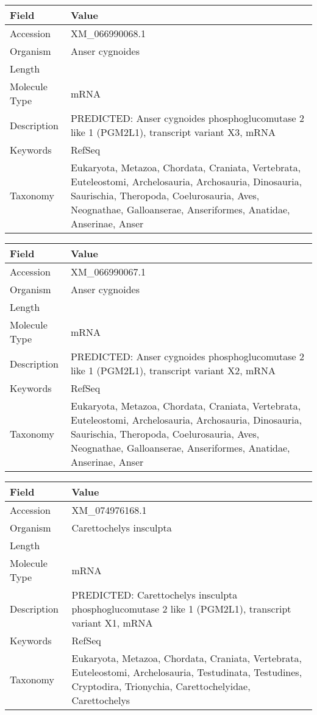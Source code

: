\documentclass[10pt]{article}
\begin{document}
{\footnotesize
\begin{longtable}{>{\raggedright\arraybackslash}p{4.5cm} >{\raggedright\arraybackslash}p{11.5cm}}
\textbf{Field} & \textbf{Value} \\
\hline
Accession & XM\_066990068.1 \\
Organism & Anser cygnoides \\
Length & 6268 \\
Molecule Type & mRNA \\
Description & PREDICTED: Anser cygnoides phosphoglucomutase 2 like 1 (PGM2L1), transcript variant X3, mRNA \\
Keywords & RefSeq \\
Taxonomy & Eukaryota, Metazoa, Chordata, Craniata, Vertebrata, Euteleostomi, Archelosauria, Archosauria, Dinosauria, Saurischia, Theropoda, Coelurosauria, Aves, Neognathae, Galloanserae, Anseriformes, Anatidae, Anserinae, Anser \\
\end{longtable}
}

{\footnotesize
\begin{longtable}{>{\raggedright\arraybackslash}p{4.5cm} >{\raggedright\arraybackslash}p{11.5cm}}
\textbf{Field} & \textbf{Value} \\
\hline
Accession & XM\_066990067.1 \\
Organism & Anser cygnoides \\
Length & 6342 \\
Molecule Type & mRNA \\
Description & PREDICTED: Anser cygnoides phosphoglucomutase 2 like 1 (PGM2L1), transcript variant X2, mRNA \\
Keywords & RefSeq \\
Taxonomy & Eukaryota, Metazoa, Chordata, Craniata, Vertebrata, Euteleostomi, Archelosauria, Archosauria, Dinosauria, Saurischia, Theropoda, Coelurosauria, Aves, Neognathae, Galloanserae, Anseriformes, Anatidae, Anserinae, Anser \\
\end{longtable}
}

{\footnotesize
\begin{longtable}{>{\raggedright\arraybackslash}p{4.5cm} >{\raggedright\arraybackslash}p{11.5cm}}
\textbf{Field} & \textbf{Value} \\
\hline
Accession & XM\_074976168.1 \\
Organism & Carettochelys insculpta \\
Length & 7568 \\
Molecule Type & mRNA \\
Description & PREDICTED: Carettochelys insculpta phosphoglucomutase 2 like 1 (PGM2L1), transcript variant X1, mRNA \\
Keywords & RefSeq \\
Taxonomy & Eukaryota, Metazoa, Chordata, Craniata, Vertebrata, Euteleostomi, Archelosauria, Testudinata, Testudines, Cryptodira, Trionychia, Carettochelyidae, Carettochelys \\
\end{longtable}
}
\end{document}

